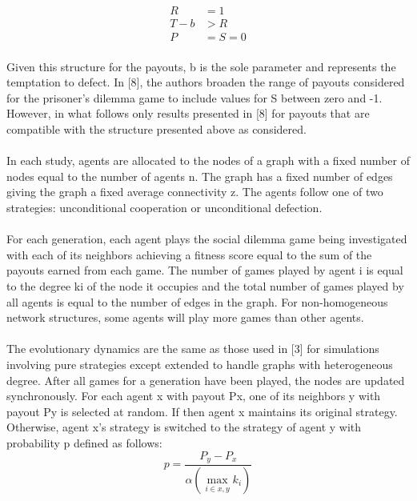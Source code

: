 \documentclass{article}
\begin{document}
    \begin{align}
    	R&=1\\
    	T-b&>R\\
    	P&=S=0
    \end{align}

    \paragraph{}Given this structure for the payouts, b is the sole parameter and represents the temptation to defect.  In [8], the authors broaden the range of payouts considered for the prisoner’s dilemma game to include values for S between zero and -1.  However, in what follows only results presented in [8] for payouts that are compatible with the structure presented above as considered.
    \paragraph{}In each study, agents are allocated to the nodes of a graph with a fixed number of nodes equal to the number of agents n.  The graph has a fixed number of edges giving the graph a fixed average connectivity z.  The agents follow one of two strategies: unconditional cooperation or unconditional defection.
    \paragraph{}For each generation, each agent plays the social dilemma game being investigated with each of its neighbors achieving a fitness score equal to the sum of the payouts earned from each game.  The number of games played by agent i is equal to the degree ki of the node it occupies and the total number of games played by all agents is equal to the number of edges in the graph.  For non-homogeneous network structures, some agents will play more games than other agents.
    \paragraph{}The evolutionary dynamics are the same as those used in [3] for simulations involving pure strategies except extended to handle graphs with heterogeneous degree.  After all games for a generation have been played, the nodes are updated synchronously.  For each agent x with payout Px, one of its neighbors y with payout Py is selected at random.  If  then agent x maintains its original strategy.  Otherwise, agent x’s strategy is switched to the strategy of agent y with probability p defined as follows:
    \begin{equation}
    	p=\frac{P_y-P_x}{\alpha\left(\max_{i\in{x,y}}k_i\right)}
    \end{equation}
\end{document}
